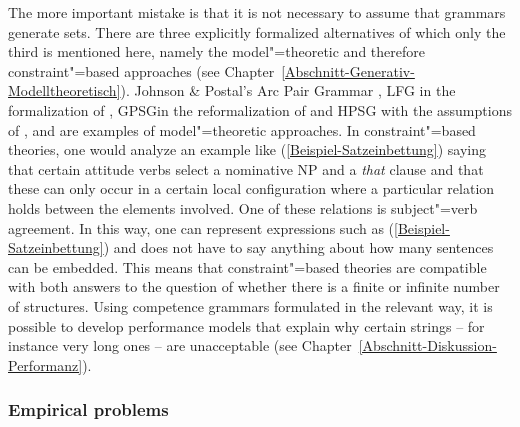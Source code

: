 The more important mistake is that it is not necessary to assume that grammars generate
sets. There are three explicitly formalized alternatives of which only the third is mentioned here,
namely the model"=theoretic and therefore constraint"=based approaches (see 
Chapter~\ref{Abschnitt-Generativ-Modelltheoretisch}). Johnson \& Postal's Arc Pair Grammar \citeyearpar{JP80a-u}, LFG\indexlfg
in the formalization of \citet{Kaplan89b}, GPSG\indexgpsg in the reformalization of \citet{Rogers97a} and HPSG\indexhpsg
with the assumptions of \citet{King99a-u}, \citet{Pollard99a} and \citet{Richter2007a} are examples of model"=theoretic approaches.
In constraint"=based theories, one would analyze an example like (\ref{Beispiel-Satzeinbettung}) saying that certain attitude verbs select a nominative NP and a 
\emph{that} clause and that these can only occur in a certain local configuration where a particular relation holds between the elements involved.
One of these relations is subject"=verb agreement. In this way, one can represent expressions such as (\ref{Beispiel-Satzeinbettung})
and does not have to say anything about how many sentences can be embedded.
This means that constraint"=based theories are compatible with both answers to the question of whether there is a finite or infinite number of structures.
Using competence grammars formulated in the relevant way, it is possible to develop performance
models that explain why certain strings -- for instance very long ones -- are unacceptable
(see Chapter~\ref{Abschnitt-Diskussion-Performanz}).

\subsubsection{Empirical problems}
\label{sec-recursion-empirical-problems}

